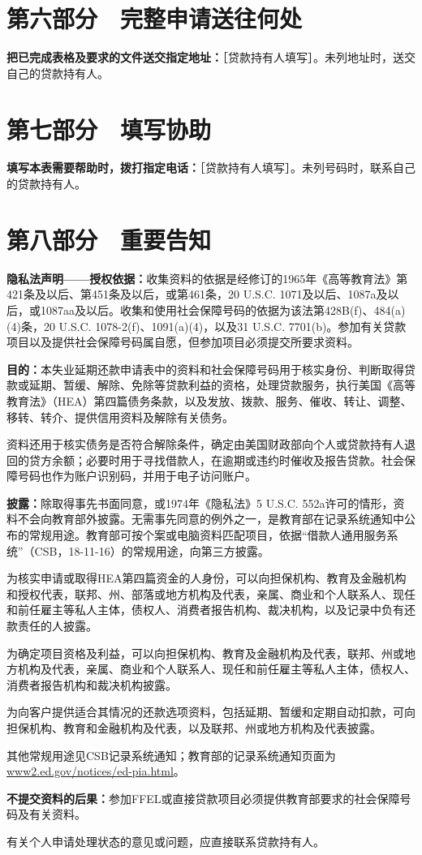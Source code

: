 \documentclass[UTF8,fontset=none,11pt,a4paper]{ctexart}
\begin{document}
\section*{第六部分　完整申请送往何处}
\textbf{把已完成表格及要求的文件送交指定地址：}［贷款持有人填写］。未列地址时，送交自己的贷\allowbreak\mbox{款持有人。}


\section*{第七部分　填写协助}
\textbf{填写本表需要帮助时，拨打指定电话：}［贷款持有人填写］。未列号码时，联系自己的贷\allowbreak\mbox{款持有人。}


\section*{第八部分　重要告知}
\textbf{隐私法声明——授权依据：}收集资料的依据是经修订的1965年《高等教育法》第421条及以后、第451条及以后，或第461条，20 U.S.C. 1071及以后、1087a及以后，或1087aa及以后。收集和使用社会保障号码的依据为该法第428B(f)、484(a)(4)条，20 U.S.C. 1078-2(f)、1091(a)(4)，以及31 U.S.C. 7701(b)。参加有关贷款项目以及提供社会保障号码属自愿，但参加项目必须提交所要\allowbreak\mbox{求资料。}


\textbf{目的：}本失业延期还款申请表中的资料和社会保障号码用于核实身份、判断取得贷款或延期、暂缓、解除、免除等贷款利益的资格，处理贷款服务，执行美国《高等教育法》（HEA）第四篇债务条款，以及发放、拨款、服务、催收、转让、调整、移转、转介、提供信用资料及解除有\allowbreak\mbox{关债务。}


资料还用于核实债务是否符合解除条件，确定由美国财政部向个人或贷款持有人退回的贷方余额；必要时用于寻找借款人，在逾期或违约时催收及报告贷款。社会保障号码也作为账户识别码，并用于电子访\allowbreak\mbox{问账户。}


\textbf{披露：}除取得事先书面同意，或1974年《隐私法》5 U.S.C. 552a许可的情形，资料不会向教育部外披露。无需事先同意的例外之一，是教育部在记录系统通知中公布的常规用途。教育部可按个案或电脑资料匹配项目，依据“借款人通用服务系统”（CSB，18-11-16）的常规用途，向第三\allowbreak\mbox{方披露。}


为核实申请或取得HEA第四篇资金的人身份，可以向担保机构、教育及金融机构和授权代表，联邦、州、部落或地方机构及代表，亲属、商业和个人联系人、现任和前任雇主等私人主体，债权人、消费者报告机构、裁决机构，以及记录中负有还款责任\allowbreak\mbox{的人披露。}


为确定项目资格及利益，可以向担保机构、教育及金融机构及代表，联邦、州或地方机构及代表，亲属、商业和个人联系人、现任和前任雇主等私人主体，债权人、消费者报告机构和裁决\allowbreak\mbox{机构披露。}


为向客户提供适合其情况的还款选项资料，包括延期、暂缓和定期自动扣款，可向担保机构、教育和金融机构及代表，以及联邦、州或地方机构及\allowbreak\mbox{代表披露。}


其他常规用途见CSB记录系统通知；教育部的记录系统通知页面为\url{www2.ed.gov/notices/ed-pia.html}。


\textbf{不提交资料的后果：}参加FFEL或直接贷款项目必须提供教育部要求的社会保障号码及有\allowbreak\mbox{关资料。}


有关个人申请处理状态的意见或问题，应直接联系贷\allowbreak\mbox{款持有人。}
\end{document}
